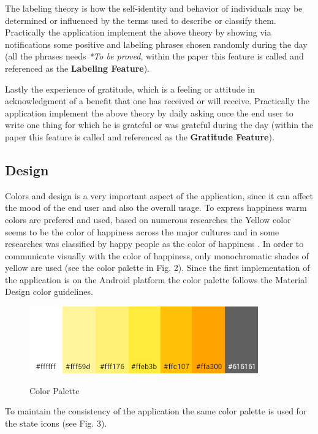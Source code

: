 \documentclass[times]{jtitauth}
\begin{document}
The labeling theory is how the self-identity and behavior of individuals may be determined
or influenced by the terms used to describe or classify them.
Practically the application implement the above theory by showing via
notifications some positive and labeling phrases
chosen randomly during the day (all the phrases needs \textit{*To be proved},
within the paper this feature is called and referenced as the \textbf{Labeling Feature}).

Lastly the experience of gratitude, which is a feeling or attitude in acknowledgment
of a benefit that one has received or will receive. 
Practically the application implement the above theory by daily asking once the end user to
write one thing for which he is grateful or was grateful during the day
(within the paper this feature is called and referenced as the \textbf{Gratitude Feature}).

\subsection{Design}
Colors and design is a very important aspect of the application, since it
can affect the mood of the end user and also the overall usage.
To express happiness warm colors are prefered and used, based on numerous researches the Yellow
color seems to be the color of happiness across the major cultures \cite{9} and in some researches was
classified by happy people as the color of happiness \cite{8}.
In order to communicate visually with the color of happiness, only monochromatic
shades of yellow are used (see the color palette in Fig. 2).
Since the first implementation of the application is on the Android platform the
color palette follows the Material Design \cite{10} color guidelines. 

\begin{figure}[H]
\includegraphics[width=\columnwidth]{HappinessTracker-color-palette}
\label{fig:color-palette}
\centering
\caption{Color Palette}
\end{figure}

To maintain the consistency of the application the same color palette is used for the state icons (see Fig. 3).
\end{document}
